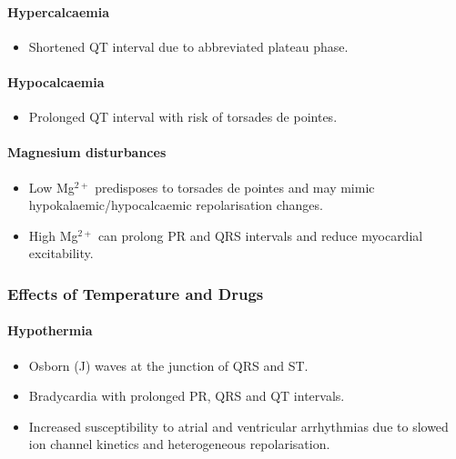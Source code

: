 \documentclass[11pt,a4paper]{article}
\begin{document}
\paragraph{Hypercalcaemia}
\begin{itemize}
  \item Shortened QT interval due to abbreviated plateau phase.
\end{itemize}

\paragraph{Hypocalcaemia}
\begin{itemize}
  \item Prolonged QT interval with risk of torsades de pointes.
\end{itemize}

\paragraph{Magnesium disturbances}
\begin{itemize}
  \item Low Mg$^{2+}$ predisposes to torsades de pointes and may mimic hypokalaemic/hypocalcaemic repolarisation changes.
  \item High Mg$^{2+}$ can prolong PR and QRS intervals and reduce myocardial excitability.
\end{itemize}

\subsubsection{Effects of Temperature and Drugs}

\paragraph{Hypothermia}
\begin{itemize}
  \item Osborn (J) waves at the junction of QRS and ST.
  \item Bradycardia with prolonged PR, QRS and QT intervals.
  \item Increased susceptibility to atrial and ventricular arrhythmias due to slowed ion channel kinetics and heterogeneous repolarisation.
\end{itemize}
\end{document}
